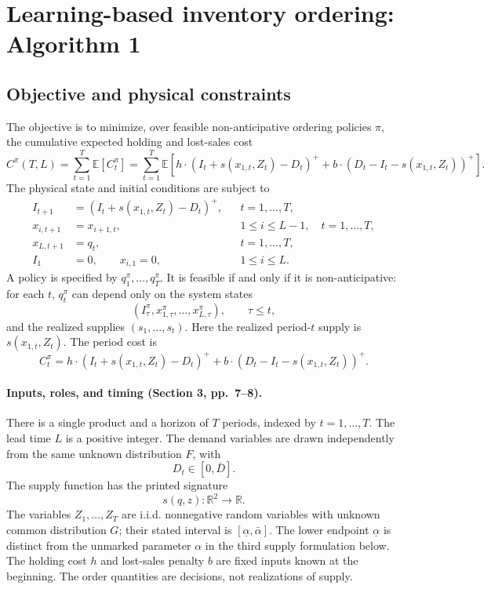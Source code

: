 \documentclass{article}
\begin{document}
\section*{Learning-based inventory ordering: Algorithm 1}

\subsection*{Objective and physical constraints}
The objective is to minimize, over feasible non-anticipative ordering policies \(\pi\), the cumulative expected holding and lost-sales cost
\begin{equation}
C^{\pi}(T,L)=\sum_{t=1}^{T}\mathbb{E}[C_t^{\pi}]
=\sum_{t=1}^{T}\mathbb{E}\left[
 h\cdot(I_t+s(x_{1,t},Z_t)-D_t)^+
 +b\cdot(D_t-I_t-s(x_{1,t},Z_t))^+
\right].\tag{1}
\end{equation}
The physical state and initial conditions are subject to
\begin{align*}
I_{t+1}&=(I_t+s(x_{1,t},Z_t)-D_t)^+,
&&t=1,\ldots,T,\\
x_{i,t+1}&=x_{i+1,t},
&&1\leq i\leq L-1,\quad t=1,\ldots,T,\\
x_{L,t+1}&=q_t,
&&t=1,\ldots,T,\\
I_1&=0,\qquad x_{i,1}=0,
&&1\leq i\leq L.
\end{align*}
A policy is specified by \(q_1^\pi,\ldots,q_T^\pi\). It is feasible if and only if it is non-anticipative: for each \(t\), \(q_t^\pi\) can depend only on the system states
\[
(I_\tau^\pi,x_{1,\tau}^\pi,\ldots,x_{L,\tau}^\pi),\qquad \tau\leq t,
\]
and the realized supplies \((s_1,\ldots,s_t)\). Here the realized period-\(t\) supply is \(s(x_{1,t},Z_t)\). The period cost is
\[
C_t^\pi=h\cdot(I_t+s(x_{1,t},Z_t)-D_t)^+
+b\cdot(D_t-I_t-s(x_{1,t},Z_t))^+.
\]

\paragraph{Inputs, roles, and timing (Section 3, pp.\ 7--8).}
There is a single product and a horizon of \(T\) periods, indexed by \(t=1,\ldots,T\). The lead time \(L\) is a positive integer. The demand variables are drawn independently from the same unknown distribution \(F\), with
\[
D_t\in[0,\bar D].
\]
The supply function has the printed signature
\[
s(q,z):\mathbb{R}^2\longrightarrow\mathbb{R}.
\]
The variables \(Z_1,\ldots,Z_T\) are i.i.d. nonnegative random variables with unknown common distribution \(G\); their stated interval is \([\underline\alpha,\bar\alpha]\). The lower endpoint \(\underline\alpha\) is distinct from the unmarked parameter \(\alpha\) in the third supply formulation below. The holding cost \(h\) and lost-sales penalty \(b\) are fixed inputs known at the beginning. The order quantities are decisions, not realizations of supply.
\end{document}
